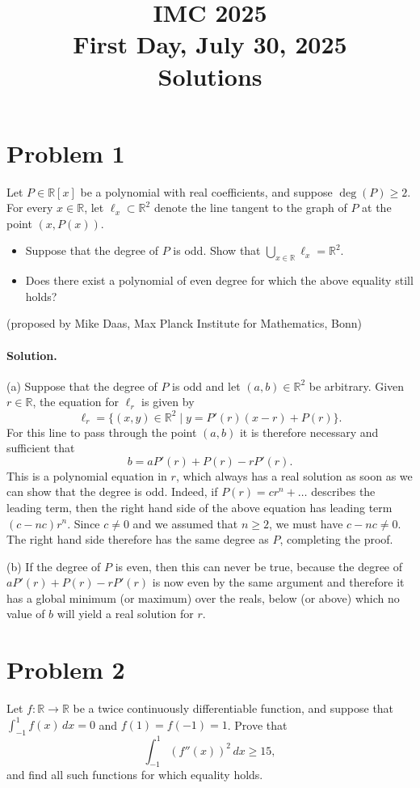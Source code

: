 \documentclass{article}
\title{IMC 2025 \\ First Day, July 30, 2025 \\ Solutions}
\date{}
\begin{document}
\maketitle

\section*{Problem 1}
Let $P \in \mathbb{R}[x]$ be a polynomial with real coefficients, and suppose $\deg(P) \geq 2$. For every $x \in \mathbb{R}$, let $\ell_x \subset \mathbb{R}^2$ denote the line tangent to the graph of $P$ at the point $(x, P(x))$.
\begin{itemize}
\item[(a)] Suppose that the degree of $P$ is odd. Show that $\bigcup_{x \in \mathbb{R}} \ell_x = \mathbb{R}^2$.
\item[(b)] Does there exist a polynomial of even degree for which the above equality still holds?
\end{itemize}
(proposed by Mike Daas, Max Planck Institute for Mathematics, Bonn)

\paragraph{Solution.}

(a) Suppose that the degree of $P$ is odd and let $(a,b) \in \mathbb{R}^2$ be arbitrary. Given $r \in \mathbb{R}$, the equation for $\ell_r$ is given by
\[
\ell_r = \{(x,y) \in \mathbb{R}^2 \mid y = P'(r)(x-r) + P(r)\}.
\]
For this line to pass through the point $(a,b)$ it is therefore necessary and sufficient that
\[
b = a P'(r) + P(r) - r P'(r).
\]
This is a polynomial equation in $r$, which always has a real solution as soon as we can show that the degree is odd. Indeed, if $P(r) = c r^n + \ldots$ describes the leading term, then the right hand side of the above equation has leading term $(c - nc) r^n$. Since $c \neq 0$ and we assumed that $n \geq 2$, we must have $c - nc \neq 0$. The right hand side therefore has the same degree as $P$, completing the proof.

(b) If the degree of $P$ is even, then this can never be true, because the degree of $a P'(r) + P(r) - r P'(r)$ is now even by the same argument and therefore it has a global minimum (or maximum) over the reals, below (or above) which no value of $b$ will yield a real solution for $r$.

\section*{Problem 2}
Let $f : \mathbb{R} \to \mathbb{R}$ be a twice continuously differentiable function, and suppose that $\int_{-1}^{1} f(x)\,dx = 0$ and $f(1) = f(-1) = 1$. Prove that
\[
\int_{-1}^{1} (f''(x))^2 \, dx \geq 15,
\]
and find all such functions for which equality holds.
\end{document}
